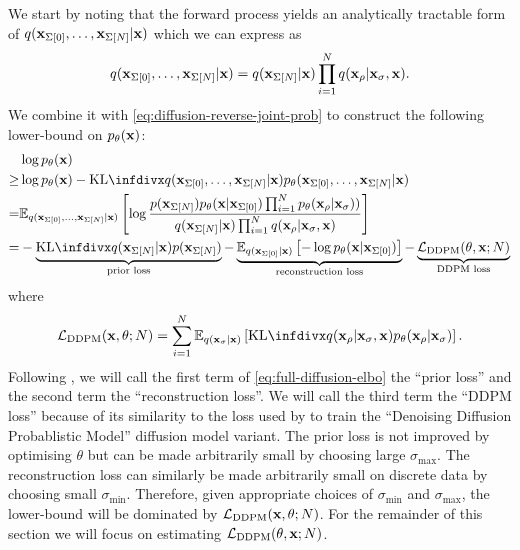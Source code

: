 We start by noting that the forward process yields an analytically tractable form of $q({\mathbf{x}}_{\Sigma[0]},\ldots,{\mathbf{x}}_{\Sigma[N]}|{\mathbf{x}})$ which we can express as
\begin{equation}
    q({\mathbf{x}}_{\Sigma[0]},\ldots,{\mathbf{x}}_{\Sigma[N]}|{\mathbf{x}}) = q({\mathbf{x}}_{\Sigma[N]}|{\mathbf{x}}) \prod_{i=1}^N q({\mathbf{x}}_{\rho} | {\mathbf{x}}_{\sigma}, {\mathbf{x}}).
\end{equation}We combine it with \cref{eq:diffusion-reverse-joint-prob} to construct the following lower-bound on $p_\theta({\mathbf{x}})$:
\begin{align}
    &\log p_\theta(\rvx) \\
    \geq &\log p_\theta(\rvx) - \kl{q(\rvx_{\Sigma[0]},\ldots,\rvx_{\Sigma[N]}|\rvx)}{p_\theta(\rvx_{\Sigma[0]},\ldots,\rvx_{\Sigma[N]}|\rvx)} \\
    = &\EX_{q(\rvx_{\Sigma[0]},\ldots,\rvx_{\Sigma[N]}|\rvx)} \left[ \log \frac{p(\rvx_{\Sigma[N]}) p_\theta(\rvx|\rvx_{\Sigma[0]}) \prod_{i=1}^N p_\theta(\rvx_{\rho} | \rvx_{\sigma}) ) }{q(\rvx_{\Sigma[N]}|\rvx) \prod_{i=1}^N q(\rvx_{\rho} | \rvx_{\sigma}, \rvx)} \right] \\
    = & -\underbrace{\kl{q(\rvx_{\Sigma[N]}|\rvx)}{p(\rvx_{\Sigma[N]})}}_\text{prior loss} - \underbrace{\EX_{q(\rvx_{\Sigma[0]}|\rvx)} \left[ - \log p_\theta(\rvx|\rvx_{\Sigma[0]}) \right]}_\text{reconstruction loss} - \underbrace{\gL_\text{DDPM}(\theta, \rvx; N)}_\text{DDPM loss} \label{eq:full-diffusion-elbo}
\end{align}
where
\begin{align}
    \gL_\text{DDPM}(\rvx, \theta; N) = \sum_{i=1}^N \EX_{q(\rvx_{\sigma}|\rvx)} \left[ \kl{q(\rvx_{\rho} | \rvx_{\sigma}, \rvx)}{p_\theta(\rvx_{\rho} | \rvx_{\sigma})} \right].
\end{align}
Following \citet{kingma2021variational}, we will call the first term of \cref{eq:full-diffusion-elbo} the ``prior loss'' and the second term the ``reconstruction loss''. We will call the third term the ``DDPM loss'' because of its similarity to the loss used by \citet{ho2020denoising} to train the ``Denoising Diffusion Probablistic Model'' diffusion model variant. The prior loss is not improved by optimising $\theta$ but can be made arbitrarily small by choosing large $\sigma_\text{max}$. The reconstruction loss can similarly be made arbitrarily small on discrete data by choosing small $\sigma_\text{min}$. Therefore, given appropriate choices of $\sigma_\text{min}$ and $\sigma_\text{max}$, the lower-bound will be dominated by ${\mathcal{L}}_\text{DDPM}({\mathbf{x}}, \theta; N)$. For the remainder of this section we will focus on estimating ${\mathcal{L}}_\text{DDPM}(\theta, {\mathbf{x}}; N)$.

